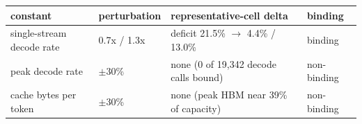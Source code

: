 \begin{tabular}{llll}
\toprule
constant & perturbation & representative-cell delta & binding \\
\midrule
single-stream decode rate & 0.7x / 1.3x & deficit 21.5\% $\to$ 4.4\% / 13.0\% & binding \\
peak decode rate & $\pm$30\% & none (0 of 19{,}342 decode calls bound) & non-binding \\
cache bytes per token & $\pm$30\% & none (peak HBM near 39\% of capacity) & non-binding \\
\bottomrule
\end{tabular}

